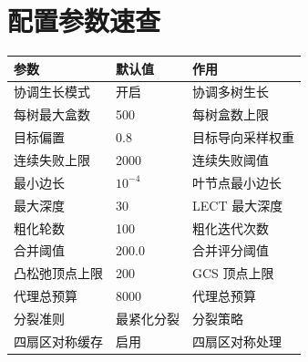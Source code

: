 \documentclass[journal]{IEEEtran}
\begin{document}
\section{配置参数速查}\label{app:config}

\begin{table}[ht]
\centering
\small
\begin{tabularx}{\columnwidth}{@{}llX@{}}
\toprule
\textbf{参数} & \textbf{默认值} & \textbf{作用} \\
\midrule
协调生长模式 & 开启 & 协调多树生长 \\
每树最大盒数 & 500 & 每树盒数上限 \\
目标偏置 & 0.8 & 目标导向采样权重 \\
连续失败上限 & 2000 & 连续失败阈值 \\
最小边长 & $10^{-4}$ & 叶节点最小边长 \\
最大深度 & 30 & LECT 最大深度 \\
粗化轮数 & 100 & 粗化迭代次数 \\
合并阈值 & 200.0 & 合并评分阈值 \\
凸松弛顶点上限 & 200 & GCS 顶点上限 \\
代理总预算 & 8000 & 代理总预算 \\
分裂准则 & 最紧化分裂 & 分裂策略 \\
四扇区对称缓存 & 启用 & 四扇区对称处理 \\
\bottomrule
\end{tabularx}
\end{table}
\end{document}
